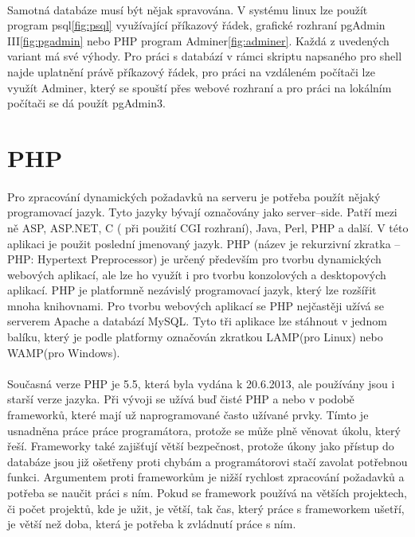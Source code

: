 \documentclass[11pt,a4paper,titlepage,oneside]{book}
\begin{document}
		\paragraph{}Samotná databáze musí být nějak spravována. V systému linux lze použít program psql\ref{fig:psql} využívající příkazový řádek, grafické rozhraní pgAdmin III\ref{fig:pgadmin} nebo PHP program Adminer\ref{fig:adminer}. Každá z uvedených variant má své výhody. Pro práci s databází v rámci skriptu napsaného pro shell najde uplatnění právě příkazový řádek, pro práci na vzdáleném počítači lze využít Adminer, který se spouští přes webové rozhraní a pro práci na lokálním počítači se dá použít pgAdmin3.




	\section{PHP}
		\paragraph{} Pro zpracování dynamických požadavků na serveru je potřeba použít nějaký programovací jazyk. Tyto jazyky bývají označovány jako server--side. Patří mezi ně ASP, ASP.NET, C ( při použití CGI rozhraní), Java, Perl, PHP a další. V této aplikaci je použit poslední jmenovaný jazyk. PHP (název je rekurzivní zkratka -- PHP: Hypertext Preprocessor) je určený především pro tvorbu dynamických webových aplikací, ale lze ho využít i pro tvorbu konzolových a desktopových aplikací. PHP je platformně nezávislý programovací jazyk, který lze rozšířit mnoha knihovnami. Pro tvorbu webových aplikací se PHP nejčastěji užívá se serverem Apache a databází MySQL. Tyto tři aplikace lze stáhnout v jednom balíku, který je podle platformy označován zkratkou LAMP(pro Linux) nebo WAMP(pro Windows).
		\paragraph{} Současná verze PHP je 5.5, která byla vydána k 20.6.2013, ale používány jsou i starší verze jazyka. Při vývoji se užívá buď čisté PHP a nebo v podobě frameworků, které mají už naprogramované často užívané prvky. Tímto je usnadněna práce práce programátora, protože se může plně věnovat úkolu, který řeší. Frameworky také zajišťují větší bezpečnost, protože úkony jako přístup do databáze jsou již ošetřeny proti chybám a programátorovi stačí zavolat potřebnou funkci. Argumentem proti frameworkům je nižší rychlost zpracování požadavků a potřeba se naučit práci s ním. Pokud se framework používá na větších projektech, či počet projektů, kde je užit, je větší, tak čas, který práce s frameworkem ušetří, je větší než doba, která je potřeba k zvládnutí práce s ním.
\end{document}
